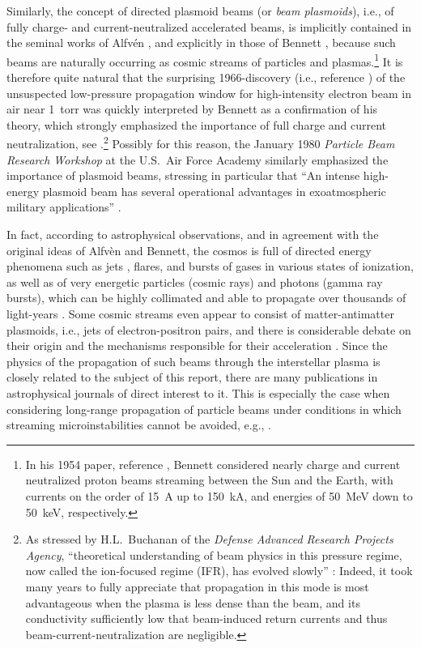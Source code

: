 \documentclass [12pt,a4paper,     ]{report} %
\begin{document}
   Similarly, the concept of directed plasmoid beams (or \emph{beam plasmoids}), i.e., of fully charge- and current-neutralized accelerated beams, is implicitly contained in the seminal works of Alfv\'en \cite{ALFVE1939-,ALFVE1981-}, and explicitly in those of Bennett \cite{BENNE1955-, BENNE1954-}, because such beams are naturally occurring as cosmic streams of particles and plasmas.\footnote{In his 1954 paper, reference \cite{BENNE1954-}, Bennett considered nearly charge and current neutralized proton beams streaming between the Sun and the Earth, with currents on the order of 15~A up to 150~kA, and energies of 50~MeV down to 50~keV, respectively.}  It is therefore quite natural that the surprising 1966-discovery (i.e., reference \cite{GRAYB1966-}) of the unsuspected low-pressure propagation window for high-intensity electron beam in air near 1~torr was quickly interpreted by Bennett as a confirmation of his theory, which strongly emphasized the importance of full charge and current neutralization, see \cite{ROBER1968-, COX--1970-, HAMME1970-}.\footnote{As stressed by H.L.~Buchanan of the \emph{Defense Advanced Research Projects Agency}, ``theoretical understanding of beam physics in this pressure regime, now called the ion-focused regime (IFR), has evolved slowly'' \cite[p.221]{BUCHA1987-}:  Indeed, it took many years to fully appreciate that propagation in this mode is most advantageous when the plasma is less dense than the beam, and its conductivity sufficiently low that beam-induced return currents and thus beam-current-neutralization are negligible.}   Possibly for this reason, the January 1980 \emph{Particle Beam Research Workshop} at the U.S.\ Air Force Academy similarly emphasized the importance of plasmoid beams, stressing in particular that ``An intense high-energy plasmoid beam has several operational advantages in exoatmospheric military applications'' \cite[p.54]{GUENT1980-}. 

   In fact, according to astrophysical observations, and in agreement with the original ideas of Alfv\`en and Bennett, the cosmos is full of directed energy phenomena such as jets \cite{VAUCO1979-}, flares, and bursts of gases in various states of ionization, as well as of very energetic particles (cosmic rays) and photons (gamma ray bursts), which can be highly collimated and able to propagate over thousands of light-years \cite{SHIBA2003-}.  Some cosmic streams even appear to consist of matter-antimatter plasmoids, i.e., jets of electron-positron pairs, and there is considerable debate on their origin and the mechanisms responsible for their acceleration \cite{GALLA1992-,HUILI1996-}.  Since the physics of the propagation of such beams through the interstellar plasma is closely related to the subject of this report, there are many publications in astrophysical journals of direct interest to it.  This is especially the case when considering long-range propagation of particle beams under conditions in which streaming microinstabilities cannot be avoided, e.g., \cite{ROSE-1984-, ROSE-1987-, SCHLI2002-}.
\end{document}
